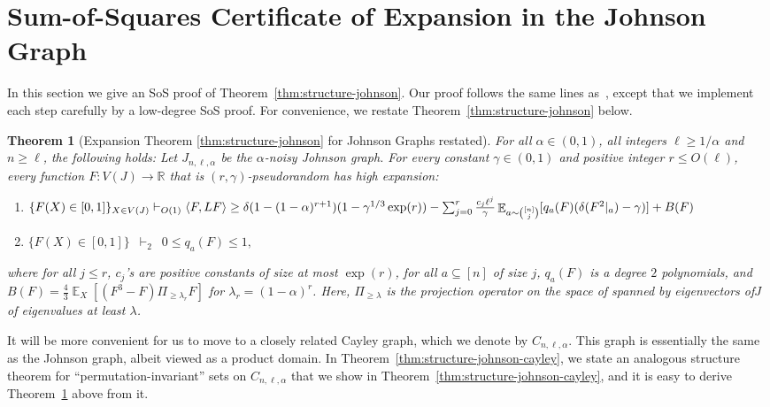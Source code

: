 \documentclass[11pt]{article}
\DeclareMathOperator*{\E}{\mathbb{E}}
\DeclarePairedDelimiter\ip{\langle}{\rangle}
\def \R {\mathbb{R}}
\def \sos {SoS\xspace}
\newtheorem{theorem}{Theorem}[section]
\theoremstyle{definition}
\begin{document}
\section{Sum-of-Squares Certificate of Expansion in the Johnson Graph}\label{sec:fourier}
In this section we give an \sos proof of Theorem~\ref{thm:structure-johnson}.
Our proof follows the same lines as~\cite{KMMS}, except that we implement each step carefully by a low-degree SoS proof. For convenience, we restate 
Theorem~\ref{thm:structure-johnson} below.
\begin{theorem}[Expansion Theorem \ref{thm:structure-johnson} for Johnson Graphs  restated]\label{thm:structure-johnson-restated}
For all $\alpha \in (0,1)$, all integers $\ell \geq 1/\alpha$ and $n \geq \ell$, the following holds: Let $J_{n,\ell,\alpha}$ be the $\alpha$-noisy Johnson graph. For every constant $\gamma \in (0,1)$ and positive integer $r \leq O(\ell)$, every function $F: V(J) \rightarrow \R$ that is $(r,\gamma)$-pseudorandom has high expansion:
\begin{enumerate}
\item $\{F(X) \in [0,1]\}_{X \in V(J)}  \vdash_{O(1)}\, \\
\ip{F,LF} \geq \delta(1 - (1-\alpha)^{r+1})(1- \gamma^{1/3}\exp(r)) - \sum_{j = 0}^r \frac{ c_j\ell^{j}}{\gamma}\E_{a \sim {[n] \choose j}}[q_a(F)({\delta(F^{ 2}|_a) - \gamma)}]+ B(F)$
\item $\{F(X) \in [0,1]\} \,\,\, \vdash_{2} \,\,\, 0 \leq q_a(F) \leq 1,$
\end{enumerate}
where for all $j \leq r$, $c_j$'s are positive constants of size at most $\exp(r)$, for all 
$a \subseteq [n]$ of size $j$, $q_a(F)$ is a degree $2$  polynomials, and $B(F)=\frac{4}{3}\E_X[(F^{ 3} - F)\Pi_{\geq \lambda_{r}}F]$ for $\lambda_r = (1-\alpha)^r$. Here, $\Pi_{\geq \lambda}$ is the projection operator on the space of spanned by eigenvectors of$J$ of eigenvalues at least $\lambda$.
\end{theorem}

It will be more convenient for us to move to a closely related Cayley graph, which we denote by $C_{n,\ell,\alpha}$. This graph is essentially the same as the Johnson graph, albeit viewed as a product domain. In Theorem~\ref{thm:structure-johnson-cayley}, we state an analogous structure theorem for ``permutation-invariant'' sets on $C_{n,\ell,\alpha}$ that we show in Theorem~\ref{thm:structure-johnson-cayley}, and it is easy to derive Theorem~\ref{thm:structure-johnson-restated} above from it.
\end{document}
